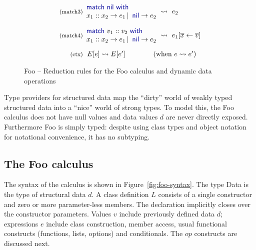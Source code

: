 \documentclass[10pt,nocopyrightspace]{sigplanconf}
\newcommand{\kvd}[1]{\textnormal{\textcolor{kvdclr}{\sffamily #1}}}
\newcommand{\ident}[1]{\textnormal{\sffamily #1}}
\newcommand{\reduce}{\rightsquigarrow}
\begin{document}
\begin{figure*}
\begin{equation*}
\begin{array}{rl}
 \\[-0.2em]
 \textnormal{\footnotesize{(match3)}}&
 \hspace{-1em}
 \begin{array}{l}
  \kvd{match}~\kvd{nil}~\kvd{with} \\[0em]
  x_1::x_2 \rightarrow e_1 \,|\, \kvd{nil} \rightarrow e_2
 \end{array} \hspace{-0.5em} ~\reduce~ e_2\\
 \\[-0.2em]
 \textnormal{\footnotesize{(match4)}}&
 \hspace{-1em}
 \begin{array}{l}
  \kvd{match}~v_1::v_2~\kvd{with} \\[0em]
  x_1::x_2 \rightarrow e_1 \,|\, \kvd{nil} \rightarrow e_2
 \end{array} \hspace{-0.5em} ~\reduce~ e_1[\overline{x}\leftarrow\overline{v}] \\
\\[-0.3em]
\textnormal{\footnotesize{(ctx)}}&
\hspace{-0.4em}
E[e] \reduce E[e'] \qquad\qquad(\textnormal{when}~e \reduce e')\\
\end{array}
\end{equation*}

\caption{Foo -- Reduction rules for the Foo calculus and dynamic data operations}
\label{fig:ff-reduction}
\end{figure*}



Type providers for structured data map the ``dirty'' world of weakly typed
structured data into a ``nice'' world of strong types. To model this, the Foo calculus
does not have \kvd{null} values and data values $d$ are never directly exposed.
Furthermore Foo is simply typed: despite using class types and object notation
for notational convenience, it has no subtyping.



\subsection{The Foo calculus}
\label{sec:formal-ff}

The syntax of the calculus is shown in Figure~\ref{fig:foo-syntax}.
The type \ident{Data} is the type of structural data $d$. A class definition $L$ consists of
a single constructor and zero or more parameter-less members. The declaration implicitly closes
over the constructor parameters.
Values $v$ include previously defined data $d$; expressions
$e$ include class construction, member access, usual functional constructs (functions,
lists, options) and conditionals. The $op$ constructs are discussed next.
\end{document}
